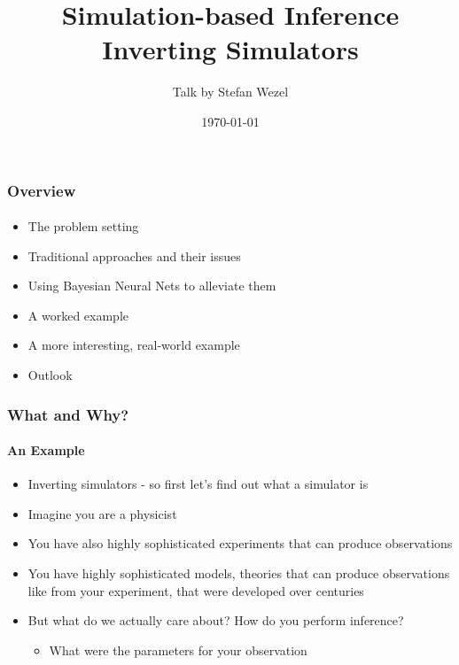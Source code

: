 \documentclass[9pt]{beamer}
\title{Simulation-based Inference \\
	\small Inverting Simulators}
\author{Talk by Stefan Wezel}
\institute{mlcolab @ Tübingen University Cluster of Excellence}
\date{\today}
\begin{document}
	

\begin{frame}[plain]
	\titlepage
\end{frame} 



\begin{frame}
\frametitle{Overview}
\framesubtitle{}
\begin{itemize}
	\item The problem setting %
	\item Traditional approaches and their issues
	\item Using Bayesian Neural Nets to alleviate them
	\item A worked example
	\item A more interesting, real-world example
	\item Outlook %
\end{itemize}
\end{frame} 






\begin{frame}
\frametitle{What and Why?}
\framesubtitle{An Example}
\begin{itemize}
	\item Inverting simulators - so first let's find out what a simulator is
	\item Imagine you are a physicist
	\item You have also highly sophisticated experiments that can produce observations
	\item You have highly sophisticated models, theories that can produce observations like from your experiment, that were developed over centuries
	\item But what do we actually care about? How do you perform inference?
	\begin{itemize}
		\item What were the parameters for your observation
	\end{itemize}
\end{itemize}
\end{frame} 
\end{document}
